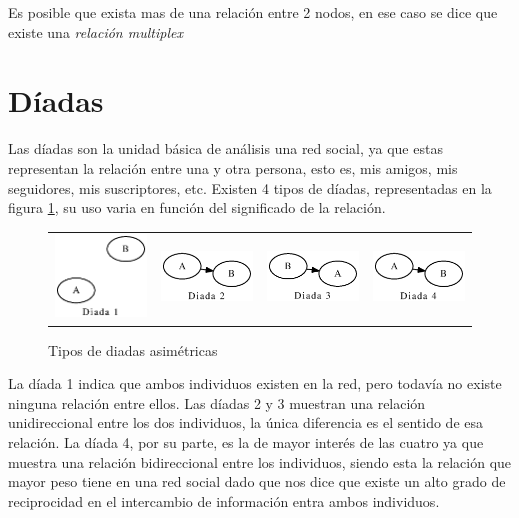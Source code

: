 Es posible que exista mas de una relación entre 2 nodos, en ese caso se dice que existe una \textit{relación multiplex}

\section{Díadas}

Las díadas son la unidad básica de análisis una red social, ya que estas representan la relación entre una y otra persona, esto es, mis amigos, mis seguidores, mis suscriptores, etc. Existen 4 tipos de díadas, representadas en la figura \ref{fig:tipos_diadas}, su uso varia en función del significado de la relación.

\begin{figure}[!htb]
  \begin{center}
      \begin{tabular}{m{3cm}|m{3cm}|m{3cm}|m{3cm}}
        \includegraphics[width=3cm]{./imagenes/diada_1.eps} & 
        \includegraphics[width=3cm]{./imagenes/diada_2.eps} & 
        \includegraphics[width=3cm]{./imagenes/diada_3.eps} & 
        \includegraphics[width=3cm]{./imagenes/diada_4.eps}\\
      \end{tabular}
    \caption{Tipos de diadas asimétricas}
    \label{fig:tipos_diadas}
  \end{center}
\end{figure}

La díada 1 indica que ambos individuos existen en la red, pero todavía no existe ninguna relación entre ellos. Las díadas 2 y 3 muestran una relación unidireccional entre los dos individuos, la única diferencia es el sentido de esa relación. La díada 4, por su parte, es la de mayor interés de las cuatro ya que muestra una relación bidireccional entre los individuos, siendo esta la relación que mayor peso tiene en una red social dado que nos dice que existe un alto grado de reciprocidad en el intercambio de información entra ambos individuos.

